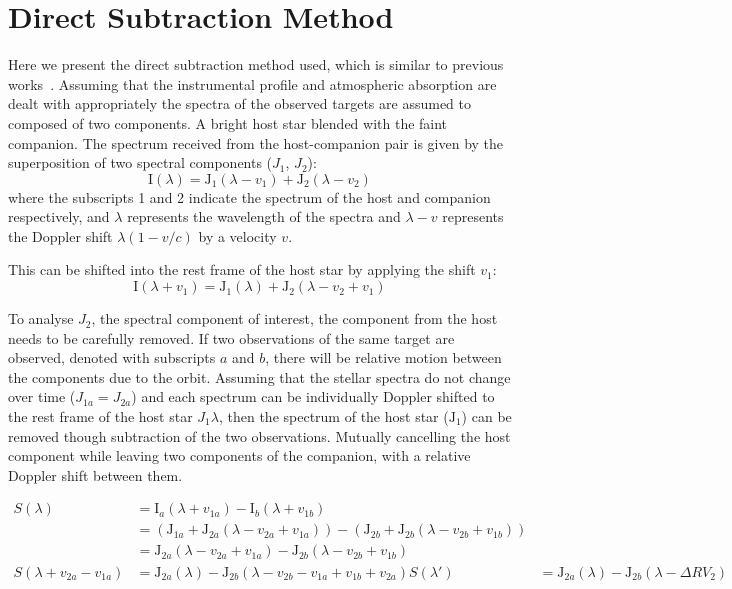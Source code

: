 \section{Direct Subtraction Method}
\label{sec:direct-subtraction}
Here we present the direct subtraction method used, which is similar to previous works~\citep{ferluga_separating_1997,kostogryz_spectral_2013}. Assuming that the instrumental profile and atmospheric absorption are dealt with appropriately the spectra of the observed targets are assumed to composed of two components. A bright host star blended with the faint companion. The spectrum received from the host-companion pair is given by the superposition of two spectral components (\(J_{1}\), \(J_{2}\)):
\begin{equation}
\textrm{I}(\lambda) = \textrm{J}_{1}(\lambda - v_{1}) + \textrm{J}_{2}(\lambda - v_{2})
\end{equation}
where the subscripts 1 and 2 indicate the spectrum of the host and companion respectively, and \(\lambda\) represents the wavelength of the spectra and \(\lambda-v\) represents the Doppler shift \(\lambda(1-v/c)\) by a velocity \(v\).

This can be shifted into the rest frame of the host star by applying the shift \(v_1\):
\begin{equation}
\textrm{I}(\lambda + v_{1}) = \textrm{J}_{1}(\lambda) + \textrm{J}_{2}(\lambda - v_{2} + v_{1})
\end{equation}

To analyse \(J_2\), the spectral component of interest, the component from the host needs to be carefully removed. If two observations of the same target are observed, denoted with subscripts \(a\) and \(b\), there will be relative motion between the components due to the orbit. Assuming that the stellar spectra do not change over time (\(J_{1a} = J_{2a}\)) and each spectrum can be individually Doppler shifted to the rest frame of the host star \(J_1{\lambda}\), then the spectrum of the host star (\(\textrm{J}_{1}\)) can be removed though subtraction of the two observations. Mutually cancelling the host component while leaving two components of the companion, with a relative Doppler shift between them. 

\begin{align}
S(\lambda) &= \textrm{I}_{a}(\lambda + v_{1a}) - \textrm{I}_{b}(\lambda + v_{1b}) \nonumber \\
&= (\textrm{J}_{1a} + \textrm{J}_{2a}(\lambda - v_{2a} + v_{1a})) - (\textrm{J}_{2b} +\textrm{J}_{2b}(\lambda - v_{2b} + v_{1b})) \nonumber \\
&= \textrm{J}_{2a}(\lambda - v_{2a} + v_{1a}) - \textrm{J}_{2b}(\lambda - v_{2b} + v_{1b}) \nonumber \\
S(\lambda + v_{2a}-v_{1a}) &= \textrm{J}_{2a}(\lambda) - \textrm{J}_{2b}(\lambda - v_{2b} - v_{1a} + v_{1b} + v_{2a}) \label{eqn:sprofile}
S(\lambda') &= \textrm{J}_{2a}(\lambda) - \textrm{J}_{2b}(\lambda - \Delta {RV}_2) \label{eqn:sprofile}
\end{align}

